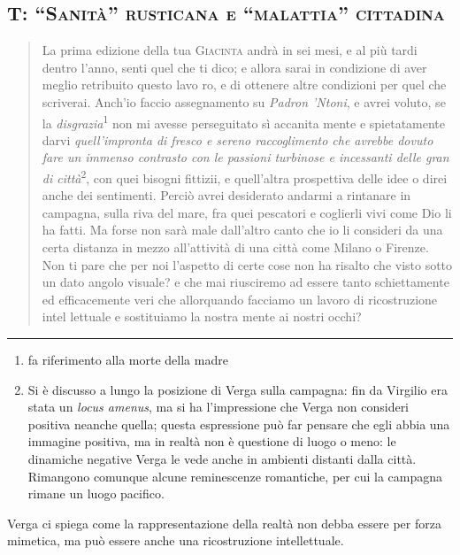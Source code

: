 \documentclass{book}
\newcounter{mar}
\newcommand{\finepoesia}{\vspace*{1em}\hrule\vspace*{1em}}
\begin{document}
\subsection{T: \textsc{``Sanità'' rusticana e ``malattia'' cittadina}}

\begin{quote}
La prima edizione della tua \textsc{Giacinta} andrà in sei mesi, e al più tardi dentro l'anno, senti quel che ti dico; e allora sarai in condizione di aver meglio retribuito questo lavo ro, e di ottenere altre condizioni per quel che scriverai. Anch'io faccio assegnamento su \textit{Padron 'Ntoni}, e avrei voluto, se la \textit{disgrazia}\textsuperscript{1} non mi avesse perseguitato sì accanita mente e spietatamente darvi \emph{quell'impronta di fresco e sereno raccoglimento che avrebbe dovuto fare un immenso contrasto con le passioni turbinose e incessanti delle gran di città}\textsuperscript{2}, con quei bisogni fittizii, e quell'altra prospettiva delle idee o direi anche dei sentimenti. Perciò avrei desiderato andarmi a rintanare in campagna, sulla riva del mare, fra quei pescatori e coglierli vivi come Dio li ha fatti. Ma forse non sarà male dall'altro canto che io li consideri da una certa distanza in mezzo all'attività di una città come Milano o Firenze. Non ti pare che per noi l'aspetto di certe cose non ha risalto che visto sotto un dato angolo visuale? e che mai riusciremo ad essere tanto schiettamente ed efficacemente veri che allorquando facciamo un lavoro di ricostruzione intel lettuale e sostituiamo la nostra mente ai nostri occhi?
\end{quote}

\finepoesia

\begin{enumerate}
\item fa riferimento alla morte
della madre
\item Si è discusso a lungo la posizione di Verga
sulla campagna: fin da Virgilio era stata un \textit{locus amenus}, ma si
ha l'impressione che Verga non consideri positiva neanche quella; questa
espressione può far pensare che egli abbia una immagine positiva, ma in
realtà non è questione di luogo o meno: le dinamiche negative Verga le
vede anche in ambienti distanti dalla città. Rimangono comunque alcune
reminescenze romantiche, per cui la campagna rimane un luogo pacifico.
\end{enumerate}

Verga ci spiega come la rappresentazione della realtà non debba essere
per forza mimetica, ma può essere anche una ricostruzione intellettuale.
\end{document}
